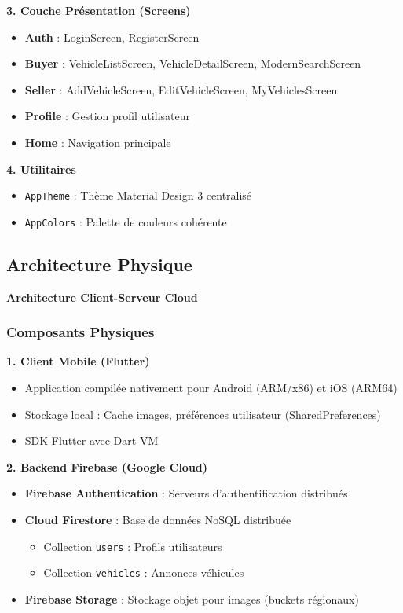 \documentclass[11pt,a4paper]{article}
\begin{document}
\textbf{3. Couche Présentation (Screens)}
\begin{itemize}
    \item \textbf{Auth} : LoginScreen, RegisterScreen
    \item \textbf{Buyer} : VehicleListScreen, VehicleDetailScreen, ModernSearchScreen
    \item \textbf{Seller} : AddVehicleScreen, EditVehicleScreen, MyVehiclesScreen
    \item \textbf{Profile} : Gestion profil utilisateur
    \item \textbf{Home} : Navigation principale
\end{itemize}

\textbf{4. Utilitaires}
\begin{itemize}
    \item \texttt{AppTheme} : Thème Material Design 3 centralisé
    \item \texttt{AppColors} : Palette de couleurs cohérente
\end{itemize}

\subsection{Architecture Physique}

\begin{tcolorbox}[colback=accentcolor!5,colframe=accentcolor,title=Infrastructure Déployée]
\textbf{Architecture Client-Serveur Cloud}
\end{tcolorbox}

\subsubsection{Composants Physiques}

\textbf{1. Client Mobile (Flutter)}
\begin{itemize}
    \item Application compilée nativement pour Android (ARM/x86) et iOS (ARM64)
    \item Stockage local : Cache images, préférences utilisateur (SharedPreferences)
    \item SDK Flutter avec Dart VM
\end{itemize}

\textbf{2. Backend Firebase (Google Cloud)}
\begin{itemize}
    \item \textbf{Firebase Authentication} : Serveurs d'authentification distribués
    \item \textbf{Cloud Firestore} : Base de données NoSQL distribuée
    \begin{itemize}
        \item Collection \texttt{users} : Profils utilisateurs
        \item Collection \texttt{vehicles} : Annonces véhicules
    \end{itemize}
    \item \textbf{Firebase Storage} : Stockage objet pour images (buckets régionaux)
\end{itemize}
\end{document}
